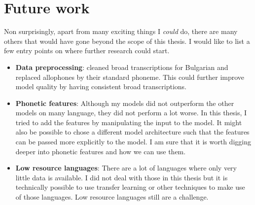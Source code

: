 \section{Future work}
Non surprisingly, apart from many exciting things I \textit{could} do, there are many others that would have gone beyond the scope of this thesis. I would like to list a few entry points on where further research could start. 

\begin{itemize}
\item \textbf{Data preprocessing}: \cite{Ashby-Bartley.2021} cleaned broad transcriptions for Bulgarian and replaced allophones by their standard phoneme. This could further improve model quality by having consistent broad transcriptions.
\item \textbf{Phonetic features}: Although my models did not outperform the other models on many language, they did not perform a lot worse. In this thesis, I tried to add the features by manipulating the input to the model. It might also be possible to chose a different model architecture such that the features can be passed more explicitly to the model. I am sure that it is worth digging deeper into phonetic features and how we can use them.
\item \textbf{Low resource languages}: There are a lot of languages where only very little data is available. I did not deal with those in this thesis but it is technically possible to use transfer learning or other techniques to make use of those languages. Low resource languages still are a challenge.
\end{itemize}